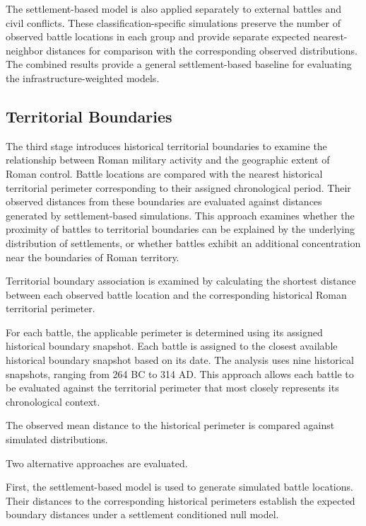\documentclass[
  letterpaper,
  DIV=11,
  numbers=noendperiod]{scrartcl}
\begin{document}
The settlement-based model is also applied separately to external
battles and civil conflicts. These classification-specific simulations
preserve the number of observed battle locations in each group and
provide separate expected nearest-neighbor distances for comparison with
the corresponding observed distributions. The combined results provide a
general settlement-based baseline for evaluating the
infrastructure-weighted models.

\subsection{Territorial Boundaries}\label{territorial-boundaries}

The third stage introduces historical territorial boundaries to examine
the relationship between Roman military activity and the geographic
extent of Roman control. Battle locations are compared with the nearest
historical territorial perimeter corresponding to their assigned
chronological period. Their observed distances from these boundaries are
evaluated against distances generated by settlement-based simulations.
This approach examines whether the proximity of battles to territorial
boundaries can be explained by the underlying distribution of
settlements, or whether battles exhibit an additional concentration near
the boundaries of Roman territory.

Territorial boundary association is examined by calculating the shortest
distance between each observed battle location and the corresponding
historical Roman territorial perimeter.

For each battle, the applicable perimeter is determined using its
assigned historical boundary snapshot. Each battle is assigned to the
closest available historical boundary snapshot based on its date. The
analysis uses nine historical snapshots, ranging from 264 BC to 314 AD.
This approach allows each battle to be evaluated against the territorial
perimeter that most closely represents its chronological context.

The observed mean distance to the historical perimeter is compared
against simulated distributions.

Two alternative approaches are evaluated.

First, the settlement-based model is used to generate simulated battle
locations. Their distances to the corresponding historical perimeters
establish the expected boundary distances under a settlement conditioned
null model.
\end{document}

